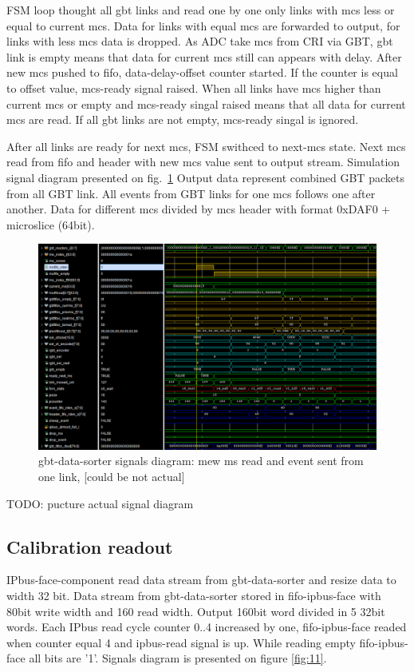 \documentclass{article}
\begin{document}
FSM loop thought all gbt links and read one by one only links with mcs less or equal to current mcs. Data for links with equal mcs are forwarded to output, for links with less mcs data is dropped.  As ADC take mcs from CRI via GBT, gbt link is empty means that data for current mcs still can appears with delay. After new mcs pushed to fifo, data-delay-offset counter started. If the counter is equal to offset value, mcs-ready signal raised. 
When all links have mcs higher than current mcs or empty and mcs-ready singal raised means that all data for current mcs are read. If all gbt links are not empty, mcs-ready singal is ignored.

After all links are ready for next mcs, FSM swithced to next-mcs state. Next mcs read from fifo and header with new mcs value sent to output stream. Simulation signal diagram presented on fig.~\ref{fig:data-sorter} Output data represent combined GBT packets from all GBT link. All events from GBT links for one mcs follows one after another. Data for different mcs divided by mcs header with format 0xDAF0 + microslice (64bit). 

\begin{figure}[H]
	\centering 
	\includegraphics[width=1.0\textwidth]{pic_signals/gbt-sorter.png}
	\caption{\label{fig:data-sorter} gbt-data-sorter signals diagram: mew ms read and event sent from one link, [could be not actual]}
\end{figure}

TODO: pucture actual signal diagram


\subsection{Calibration readout}\label{sec:data-rd}
IPbus-face-component read data stream from gbt-data-sorter and resize data to width 32 bit. Data stream from gbt-data-sorter stored in fifo-ipbus-face with 80bit write width and 160 read width. Output 160bit word divided in 5 32bit words. Each IPbus read cycle counter 0..4 increased by one, fifo-ipbus-face readed when counter equal 4 and ipbus-read signal is up. While reading empty fifo-ipbus-face all bits are '1'. Signals diagram is presented on figure \ref{fig:11}.
\end{document}
